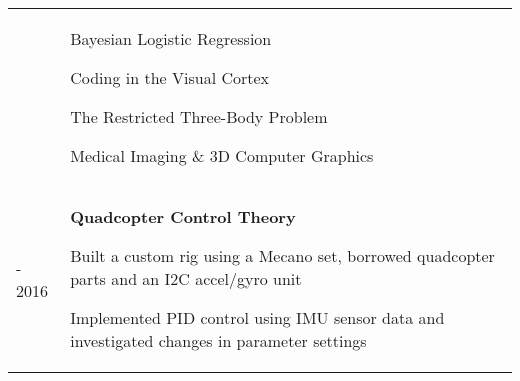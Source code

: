 \documentclass[letterpaper, 10pt]{article}
\begin{document}
\begin{tabularx}{\linewidth}{>{\raggedleft}p{2.2cm}|X X}
\begin{compact}
	\vspace{-.5\baselineskip}
\end{compact}&
\begin{compact}
	\vspace{-.5\baselineskip}
    \item Bayesian Logistic Regression
    \item Coding in the Visual Cortex
    \item The Restricted Three-Body Problem
    \item Medical Imaging \& 3D Computer Graphics
	\vspace{-.5\baselineskip}
\end{compact}\\
2015 - 2016 & \multicolumn{2}{p{\linegoal}}{
	\vspace{-2.9mm}\textbf{Quadcopter Control Theory}
	\begin{compact}
	\item Built a custom rig using a Mecano set, borrowed quadcopter parts and an I2C accel/gyro unit
	\item Implemented PID control using IMU sensor data and investigated changes in parameter settings
	\vspace{-\baselineskip}
	\end{compact}
}\\
\end{tabularx}

\vspace{-0.5\baselineskip}
\end{document}
